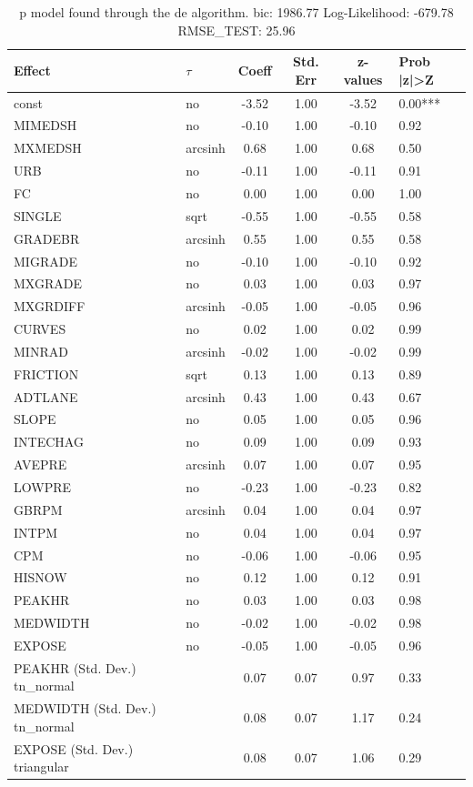 \begin{table}
	\caption{p model found through the de algorithm. bic: 1986.77 Log-Likelihood: -679.78 RMSE_TEST: 25.96}
	\begin{center}
		\begin{tabular}{|l|l|c|c|c|l|}
			\hline
			Effect & $\tau$ & Coeff & Std. Err & z-values & Prob |z|>Z \\
			\hline
			const & no & -3.52 & 1.00 & -3.52 & 0.00*** \\
			\hline
			MIMEDSH & no & -0.10 & 1.00 & -0.10 & 0.92 \\
			\hline
			MXMEDSH & arcsinh & 0.68 & 1.00 & 0.68 & 0.50 \\
			\hline
			URB & no & -0.11 & 1.00 & -0.11 & 0.91 \\
			\hline
			FC & no & 0.00 & 1.00 & 0.00 & 1.00 \\
			\hline
			SINGLE & sqrt & -0.55 & 1.00 & -0.55 & 0.58 \\
			\hline
			GRADEBR & arcsinh & 0.55 & 1.00 & 0.55 & 0.58 \\
			\hline
			MIGRADE & no & -0.10 & 1.00 & -0.10 & 0.92 \\
			\hline
			MXGRADE & no & 0.03 & 1.00 & 0.03 & 0.97 \\
			\hline
			MXGRDIFF & arcsinh & -0.05 & 1.00 & -0.05 & 0.96 \\
			\hline
			CURVES & no & 0.02 & 1.00 & 0.02 & 0.99 \\
			\hline
			MINRAD & arcsinh & -0.02 & 1.00 & -0.02 & 0.99 \\
			\hline
			FRICTION & sqrt & 0.13 & 1.00 & 0.13 & 0.89 \\
			\hline
			ADTLANE & arcsinh & 0.43 & 1.00 & 0.43 & 0.67 \\
			\hline
			SLOPE & no & 0.05 & 1.00 & 0.05 & 0.96 \\
			\hline
			INTECHAG & no & 0.09 & 1.00 & 0.09 & 0.93 \\
			\hline
			AVEPRE & arcsinh & 0.07 & 1.00 & 0.07 & 0.95 \\
			\hline
			LOWPRE & no & -0.23 & 1.00 & -0.23 & 0.82 \\
			\hline
			GBRPM & arcsinh & 0.04 & 1.00 & 0.04 & 0.97 \\
			\hline
			INTPM & no & 0.04 & 1.00 & 0.04 & 0.97 \\
			\hline
			CPM & no & -0.06 & 1.00 & -0.06 & 0.95 \\
			\hline
			HISNOW & no & 0.12 & 1.00 & 0.12 & 0.91 \\
			\hline
			PEAKHR & no & 0.03 & 1.00 & 0.03 & 0.98 \\
			\hline
			MEDWIDTH & no & -0.02 & 1.00 & -0.02 & 0.98 \\
			\hline
			EXPOSE & no & -0.05 & 1.00 & -0.05 & 0.96 \\
			\hline
			PEAKHR (Std. Dev.) tn_normal &  & 0.07 & 0.07 & 0.97 & 0.33 \\
			\hline
			MEDWIDTH (Std. Dev.) tn_normal &  & 0.08 & 0.07 & 1.17 & 0.24 \\
			\hline
			EXPOSE (Std. Dev.) triangular &  & 0.08 & 0.07 & 1.06 & 0.29 \\
			\hline
		\end{tabular}
	\end{center}
\end{table}